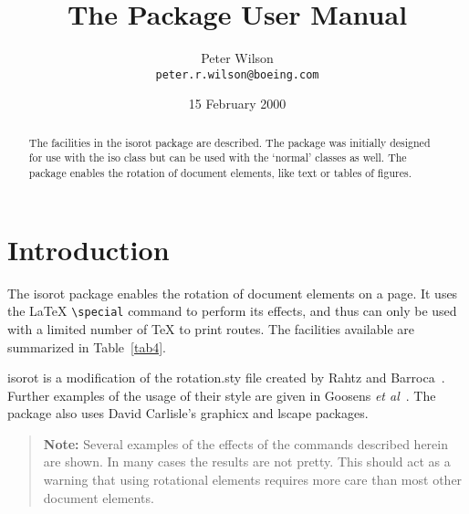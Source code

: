 \documentclass[11pt]{article}
\title{The \file{isorot} Package User Manual}
\author{Peter Wilson\\ \texttt{peter.r.wilson@boeing.com}}
\date{15 February 2000}
\newcommand{\latex}{\LaTeX}
\newcommand{\file}[1]{\textsf{#1}}
\newenvironment{note}{\begin{quotation}\small\textbf{Note: }}{\par\end{quotation}}
\newcommand{\tref}[1]{Table~\ref{#1}}
\begin{document}
\maketitle

\begin{abstract}
The facilities in the \file{isorot} package are described. The package
was initially designed for use with the \file{iso} class but can be used
with the `normal' classes as well. The package enables the rotation of 
document elements, like text or tables of figures.
\end{abstract}
\tableofcontents
\listoffigures
\listoftables
\clearpage
\pagestyle{headings}


\section{Introduction}

   The \file{isorot} package enables the rotation of document elements on
a page. It uses the \latex{} \verb|\special| command to perform its
effects, and thus can only be used
with a limited number of \TeX{} to print routes. The facilities
available are summarized in \tref{tab4}.

    \file{isorot} is a modification of the \file{rotation.sty} file
created by Rahtz and Barroca~\cite{rahtz}. Further examples of the usage
of their style are given in Goosens \emph{et al}~\cite{goosens}. The
package also uses David Carlisle's \file{graphicx} and \file{lscape}
packages.

\begin{note}Several examples of the effects of the commands described herein
are shown. In many cases the results are not pretty. This should act as
a warning that using rotational elements requires more care than
most other document elements.\end{note} %
\end{document}
